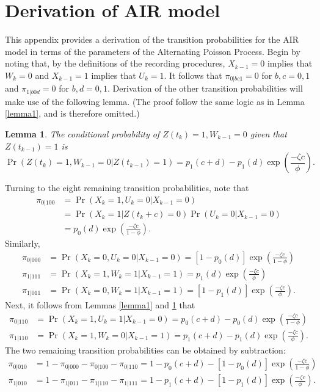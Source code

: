 \documentclass[man, noextraspace, floatsintext]{apa6}\usepackage[]{graphicx}\usepackage[]{color}
\newtheorem{lemma}{Lemma}
\begin{document}
\section{Derivation of AIR model}
\label{app:AIR_derivation}

This appendix provides a derivation of the transition probabilities for the AIR model in terms of the parameters of the Alternating Poisson Process. Begin by noting that, by the definitions of the recording procedures, $X_{k-1} = 0$ implies that $W_k = 0$ and $X_{k-1} = 1$ implies that $U_k = 1$. It follows that $\pi_{0|bc1} = 0$ for $b,c = 0,1$ and $\pi_{1|b0d} = 0$ for $b,d=0,1$. Derivation of the other transition probabilities will make use of the following lemma. (The proof follow the same logic as in Lemma \ref{lemma1}, and is therefore omitted.)

\begin{lemma}
\label{lemma2}
The conditional probability of $Z(t_k) = 1, W_{k-1} = 0$ given that $Z(t_{k-1}) = 1$ is
\[
\Pr\left(Z(t_k) = 1, W_{k-1} = 0 \left| Z(t_{k-1}) = 1 \right.\right) = p_1(c + d) - p_1(d) \exp\left(\frac{- \zeta c}{\phi}\right). \]
\end{lemma}

Turning to the eight remaining transition probabilities, note that
\begin{align*}
\pi_{0|100} &= \Pr\left(X_k = 1, U_k = 0 | X_{k-1} = 0\right) \\
&= \Pr\left(X_k = 1 | Z(t_k + c) = 0\right) \Pr\left(U_k = 0 | X_{k-1} = 0\right) \\
&= p_0(d)\exp\left(\frac{- \zeta c}{1 - \phi}\right).
\end{align*}
Similarly,
\begin{align*}
\pi_{0|000} &= \Pr\left(X_k = 0, U_k = 0 | X_{k-1} = 0\right) = \left[1 - p_0(d)\right]\exp\left(\frac{- \zeta c}{1 - \phi}\right) \\
\pi_{1|111} &= \Pr\left(X_k = 1, W_k = 1 | X_{k-1} = 1\right) = p_1(d)\exp\left(\frac{- \zeta c}{\phi}\right) \\
\pi_{1|011} &= \Pr\left(X_k = 0, W_k = 1 | X_{k-1} = 1\right) = \left[1 - p_1(d)\right]\exp\left(\frac{- \zeta c}{\phi}\right).
\end{align*}
Next, it follows from Lemmas \ref{lemma1} and \ref{lemma2} that
\begin{align*}
\pi_{0|110} &= \Pr\left(X_k = 1, U_k = 1 | X_{k-1} = 0\right) = p_0(c + d) - p_0(d) \exp\left(\frac{- \zeta c}{1 - \phi}\right) \\
\pi_{1|110} &= \Pr\left(X_k = 1, W_k = 0 | X_{k-1} = 1\right) = p_1(c + d) - p_1(d) \exp\left(\frac{- \zeta c}{\phi}\right).
\end{align*}
The two remaining transition probabilities can be obtained by subtraction:
\begin{align*}
\pi_{0|010} &= 1 - \pi_{0|000} - \pi_{0|100} - \pi_{0|110} = 1 - p_0(c + d) - \left[1 - p_0(d)\right]\exp\left(\frac{- \zeta c}{1 - \phi}\right) \\
\pi_{1|010} &= 1 - \pi_{1|011} - \pi_{1|110} - \pi_{1|111} = 1 - p_1(c + d) - \left[1 - p_1(d)\right]\exp\left(\frac{- \zeta c}{\phi}\right).
\end{align*}
\end{document}
